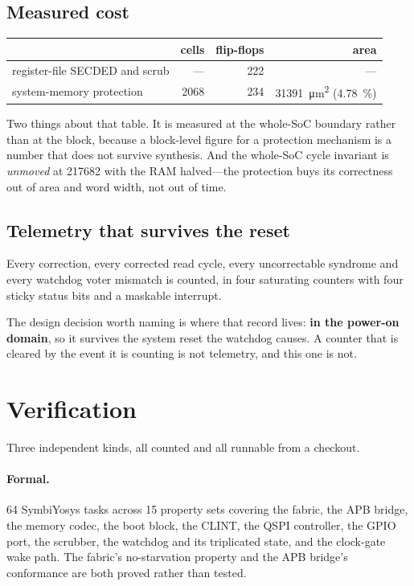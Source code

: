 \documentclass[11pt,a4paper]{article}
\begin{document}
\subsection{Measured cost}

\begin{center}
\begin{tabular}{lrrr}
\toprule
& cells & flip-flops & area \\
\midrule
register-file SECDED and scrub & --- & \num{222} & --- \\
system-memory protection & \num{2068} & \num{234} &
  \SI{31391}{\micro\meter\squared} (\SI{4.78}{\percent}) \\
\bottomrule
\end{tabular}
\end{center}

Two things about that table. It is measured at the whole-SoC boundary
rather than at the block, because a block-level figure for a protection
mechanism is a number that does not survive synthesis. And the
whole-SoC cycle invariant is \emph{unmoved} at \num{217682} with the RAM
halved---the protection buys its correctness out of area and word width,
not out of time.

\subsection{Telemetry that survives the reset}

Every correction, every corrected read cycle, every uncorrectable
syndrome and every watchdog voter mismatch is counted, in four
saturating counters with four sticky status bits and a maskable
interrupt.

The design decision worth naming is where that record lives: \textbf{in
the power-on domain}, so it survives the system reset the watchdog
causes. A counter that is cleared by the event it is counting is not
telemetry, and this one is not.

\section{Verification}
\label{sec:verify}

Three independent kinds, all counted and all runnable from a checkout.

\paragraph{Formal.} \num{64} SymbiYosys tasks across \num{15} property
sets covering the fabric, the APB bridge, the memory codec, the boot
block, the CLINT, the QSPI controller, the GPIO port, the scrubber, the
watchdog and its triplicated state, and the clock-gate wake path. The
fabric's no-starvation property and the APB bridge's conformance are
both proved rather than tested.
\end{document}
